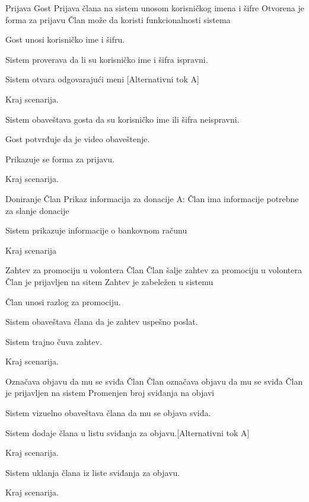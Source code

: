         {Prijava}
        {Gost}
        {Prijava člana na sistem unosom korisničkog imena i šifre}
        {Otvorena je forma za prijavu}
        {Član može da koristi funkcionalnosti sistema}
        {
            \item Gost unosi korisničko ime i šifru.
            \item Sistem proverava da li su korisničko ime i šifra ispravni.
            \item Sistem otvara odgovarajući meni [Alternativni tok A]
            \item Kraj scenarija.
        }
        {
            {
                \item Sistem obaveštava gosta da su korisničko ime ili šifra neispravni.
                \item Gost potvrđuje da je video obaveštenje.
                \item Prikazuje se forma za prijavu.
                \item Kraj scenarija.
            }
        }

         {Doniranje}
         {Član}
         {Prikaz informacija za donacije}
         {}
         {A: Član ima informacije potrebne za slanje donacije}
         {
            \item Sistem prikazuje informacije o bankovnom računu
            \item Kraj scenarija
         }
         {}

         {Zahtev za promociju u volontera}
         {Član}
         {Član šalje zahtev za promociju u volontera}
         {Član je prijavljen na sitem}
         {Zahtev je zabeležen u sistemu}
         {
            \item Član unosi razlog za promociju.
            \item Sistem obaveštava člana da je zahtev uspešno poslat.
            \item Sistem trajno čuva zahtev.
            \item Kraj scenarija.
         }{}

         {Označava objavu da mu se sviđa}
         {Član}
         {Član označava objavu da mu se sviđa}
         {Član je prijavljen na sistem}
         {Promenjen broj sviđanja na objavi}
         {
            \item Sistem vizuelno obaveštava člana da mu se objava sviđa.
            \item Sistem dodaje člana u listu sviđanja za objavu.[Alternativni tok A]
            \item Kraj scenarija.
         }
         {
            {
                \item Sistem uklanja člana iz liste sviđanja za objavu.
                \item Kraj scenarija.
            }
         }

